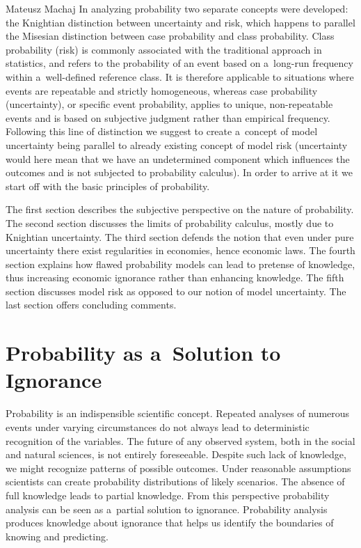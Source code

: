 \begin{artengenv}{Mateusz Machaj}
In analyzing probability two separate concepts were developed: the Knightian distinction between uncertainty and risk, which happens to parallel the Misesian distinction between case probability and class probability. Class probability (risk) is commonly associated with the traditional approach in statistics, and refers to the probability of an event based on a~long-run frequency within a~well-defined reference class. It is therefore applicable to situations where events are repeatable and strictly homogeneous, whereas case probability (uncertainty), or specific event probability, applies to unique, non-repeatable events and is based on subjective judgment rather than empirical frequency. Following this line of distinction we suggest to create a~concept of model uncertainty being parallel to already existing concept of model risk (uncertainty would here mean that we have an undetermined component which influences the outcomes and is not subjected to probability calculus). In order to arrive at it we start off with the basic principles of probability.



The first section describes the subjective perspective on the nature of probability. The second section discusses the limits of probability calculus, mostly due to Knightian uncertainty. The third section defends the notion that even under pure uncertainty there exist regularities in economies, hence economic laws. The fourth section explains how flawed probability models can lead to pretense of knowledge, thus increasing economic ignorance rather than enhancing knowledge. The fifth section discusses model risk as opposed to our notion of model uncertainty. The last section offers concluding comments.



\section{Probability as a~Solution to Ignorance}

Probability is an indispensible scientific concept. Repeated analyses of numerous events under varying circumstances do not always lead to deterministic recognition of the variables. The future of any observed system, both in the social and natural sciences, is not entirely foreseeable. Despite such lack of knowledge, we might recognize patterns of possible outcomes. Under reasonable assumptions scientists can create probability distributions of likely scenarios. The absence of full knowledge leads to partial knowledge. From this perspective probability analysis can be seen as a~partial solution to ignorance. Probability analysis produces knowledge about ignorance that helps us identify the boundaries of knowing and predicting.




\end{artengenv}
